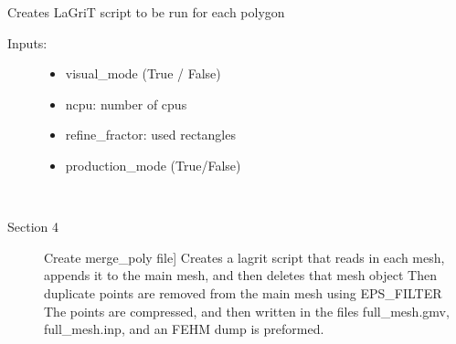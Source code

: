 \documentclass[letterpaper,10pt,english]{sphinxmanual}
\begin{document}
\begin{fulllineitems}
\label{\detokenize{pydfnworks:pydfnworks.lagrit_scripts.create_lagrit_scripts}}
Creates LaGriT script to be run for each polygon
\begin{description}
\item[{Inputs: }] \leavevmode\begin{itemize}
\item {} 
visual\_mode (True / False)

\item {} 
ncpu: number of cpus

\item {} 
refine\_fractor: used rectangles

\item {} 
production\_mode (True/False)

\end{itemize}

\end{description}

\end{fulllineitems}


\begin{fulllineitems}
\label{\detokenize{pydfnworks:pydfnworks.lagrit_scripts.create_merge_poly_files}}~\begin{description}
\item[{Section 4}] \leavevmode{[}Create merge\_poly file{]}
Creates a lagrit script that reads in each mesh, appends it to the main mesh, and then deletes that mesh object
Then duplicate points are removed from the main mesh using EPS\_FILTER 
The points are compressed, and then written in the files full\_mesh.gmv, full\_mesh.inp, and an FEHM dump is preformed.

\end{description}

\end{fulllineitems}

\end{document}
